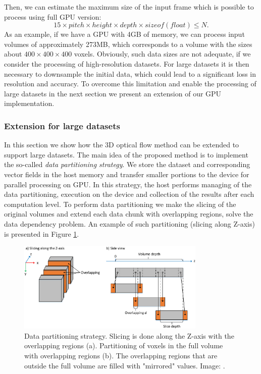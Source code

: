 Then, we can estimate the maximum size of the input frame which is possible to process using full GPU version: 
\begin{equation}
15 \times pitch \times height \times depth \times sizeof(float) \leq N.
\end{equation}  
As an example, if we have a GPU with 4GB of memory, we can process input volumes of approximately 273MB, which corresponds to a volume with the sizes about $400 \times 400 \times 400$ voxels.
Obviously, such data sizes are not adequate, if we consider the processing of high-resolution datasets. For large datasets it is then necessary to downsample the initial data, which could lead to a significant loss in resolution and accuracy. To overcome this limitation and enable the processing of large datasets in the next section we present an extension of our GPU implementation.

\subsubsection{Extension for large datasets}

In this section we show how the 3D optical flow method can be extended to support large datasets.
The main idea of the proposed method is to implement the so-called \textit{data partitioning strategy}. We store the dataset and corresponding vector fields in the host memory and transfer smaller portions to the device for parallel processing on GPU. In this strategy, the host performs managing of the data partitioning, execution on the device and collection of the results after each computation level. To perform data partitioning we make the slicing of the original volumes and extend each data chunk with overlapping regions, solve the data dependency problem.   
An example of such partitioning (slicing along Z-axis) is presented in Figure \ref{fig:slicing-overlap}.

\begin{figure}[h]
	\centering
	\includegraphics[width=0.8\textwidth]{figures/slicing-overlap.pdf}
	\caption{Data partitioning strategy. Slicing is done along the Z-axis with the overlapping regions (a). Partitioning of voxels in the full volume with overlapping regions (b). The overlapping regions that are outside the full volume are filled with "mirrored" values. Image: \cite{KarlinskiyThesis}.}
	\label{fig:slicing-overlap}
\end{figure}

